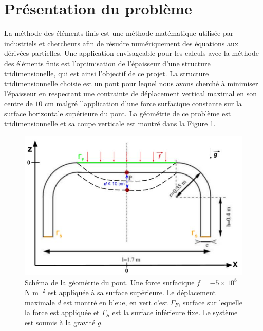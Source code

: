 \documentclass{article}
\begin{document}


    \section{Présentation du problème}
    La méthode des éléments finis est une méthode matématique utilisée par industriels et chercheurs afin de résudre numériquement des équations aux dérivées partielles. Une application envisageable pour les calculs avec la méthode des éléments finis est l'optimisation de l'épaisseur d'une structure tridimensionelle, 
    qui est ainsi l'objectif de ce projet. 
    La structure tridimensionnelle choisie est un pont pour lequel nous avons cherché à minimiser l'épaisseur
    en respectant une contrainte de déplacement vertical maximal en son centre de $10$ cm malgré l'application d'une force surfacique
    constante sur la surface horizontale supérieure du pont. 
    La géométrie de ce problème est tridimensionnelle et sa coupe verticale est montré dans la Figure \ref{fig:problem}.
    \begin{figure}[H]        
    \begin{center}
	
        \includegraphics[width=12cm]{imgs/coupe_2D-schema.JPG}
        \caption{Schéma de la géométrie du pont. Une force surfacique $f= - 5\times10^8$ N m$^{-2}$ est appliquée à sa surface supérieure. Le déplacement maximale $d$ est montré en bleue, en vert c'est $\Gamma_F$, surface sur lequelle la force est appliquée et $\Gamma_S$ est la surface inférieure fixe. Le système est soumis à la gravité $g$.}
        \label{fig:problem}
    
	\end{center}
    \end{figure}
    
\end{document}

